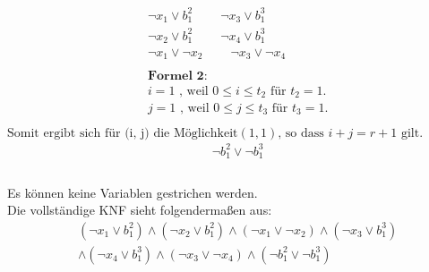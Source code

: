\documentclass[a4,abstract=on]{scrartcl}
\begin{document}
\begin{align*}
&\neg x_1 \vee b_1^2 {~~~~~~~~~~} \neg x_3 \vee b_1^3\\
&\neg x_2 \vee b_1^2 {~~~~~~~~~~} \neg x_4 \vee b_1^3\\
&\neg x_1 \vee \neg x_2 {~~~~~~~~~~} \neg x_3 \vee \neg x_4\\
\\
&\textbf{Formel 2:}\\
&i=1 \text{ , weil } 0\leq i \leq t_2 \text{ für } t_2 = 1.\\
&j=1 \text{ , weil } 0\leq j \leq t_3 \text{ für } t_3=1.\\
\end{align*}
$\text{Somit ergibt sich für (i, j) die Möglichkeit} (1,1) \text{, }\text{so dass } i+j = r+1 \text{  gilt.}$
\begin{align*}
&\neg b_1^2 \vee \neg b_1^3\\
\end{align*}
\ \\
Es können keine Variablen gestrichen werden.\\
Die vollständige KNF sieht folgendermaßen aus:\\
\begin{align*}
&(\neg x_1 \vee b_1^2) \wedge (\neg x_2 \vee b_1^2) \wedge (\neg x_1 \vee \neg x_2) \wedge (\neg x_3 \vee b_1^3)\\
&\wedge (\neg x_4 \vee b_1^3) \wedge (\neg x_3 \vee \neg x_4) \wedge (\neg b_1^2 \vee \neg b_1^3)\\
\end{align*}
\end{document}
